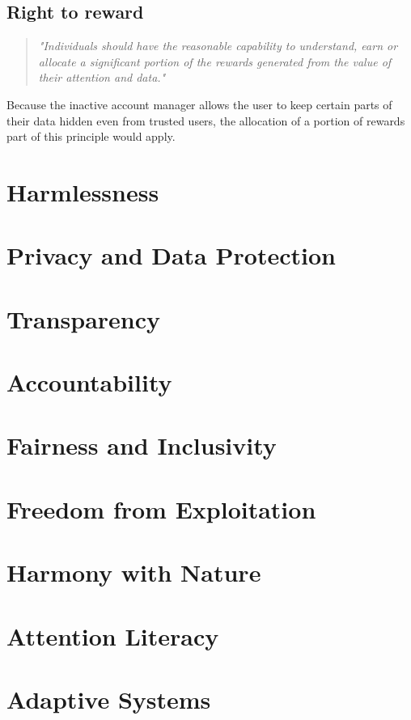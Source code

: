 \documentclass[12pt]{article}
\begin{document}
    \subsection{Right to reward}
    \begin{quote}
        \textit{"Individuals should have the reasonable capability to understand, earn or allocate a
        significant portion of the rewards generated from the value of their attention and
        data."}
    \end{quote}

    Because the inactive account manager allows the user to keep certain parts of their data hidden even from trusted users, the allocation of a portion of rewards part of this principle would apply.



\section{Harmlessness}




\section{Privacy and Data Protection}




\section{Transparency}




\section{Accountability}




\section{Fairness and Inclusivity}




\section{Freedom from Exploitation}




\section{Harmony with Nature}




\section{Attention Literacy}




\section{Adaptive Systems}
\end{document}
